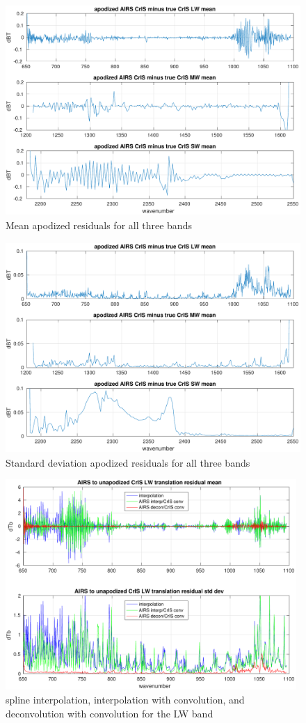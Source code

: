 \documentclass[12pt]{article}
\begin{document}
\begin{figure} %
  \centering
  \includegraphics[height=8cm]{figures/combo_ap_dif_mean.pdf}
  \caption{Mean apodized residuals for all three bands}
  \label{meanAll}
\end{figure}

\begin{figure} %
  \centering
  \includegraphics[height=8cm]{figures/combo_ap_dif_std.pdf}
  \caption{Standard deviation apodized residuals for all three bands}
  \label{stdAll}
\end{figure}

\begin{figure} %
  \centering
  \includegraphics[height=8cm]{figures/a2cris_interp_LW.pdf}
  \caption{spline interpolation, interpolation with convolution, 
    and deconvolution with convolution for the {\cris} LW band}
  \label{intpLW}
\end{figure}
\end{document}
